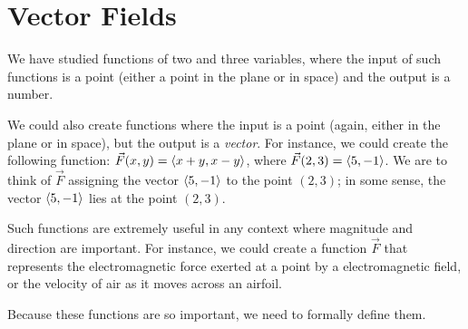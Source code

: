 \section{Vector Fields}\label{sec:vector_fields}

We have studied functions of two and three variables, where the input of such functions is a point (either a point in the plane or in space) and the output is a number.

We could also create functions where the input is a point (again, either in the plane or in space), but the output is a \emph{vector}. For instance, we could create the following function: $\vec F(x,y) =\left\langle x+y, x-y\right\rangle$, where $\vec F(2,3) =\left\langle 5,-1\right\rangle$. We are to think of $\vec F$ assigning the vector $\left\langle 5,-1\right\rangle$ to the point $(2,3)$; in some sense, the vector $\left\langle 5,-1\right\rangle$ lies at the point $(2,3)$. 

Such functions are extremely useful in any context where magnitude and direction are important. For instance, we could create a function $\vec F$ that represents the electromagnetic force exerted at a point by a electromagnetic field, or the velocity of air as it moves across an airfoil. 

Because these functions are so important, we need to formally define them.

